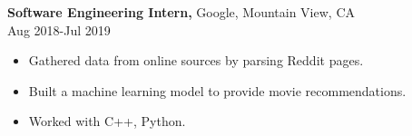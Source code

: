 \documentclass[margin]{res}
\begin{document}
\begin{resume}
{\bf Software Engineering Intern,} Google, Mountain View, CA \\ Aug 2018-Jul 2019
\begin{itemize} \itemsep -2pt %
\item Gathered data from online sources by parsing Reddit pages.
\item Built a machine learning model to provide movie recommendations.
\item Worked with C++, Python.
\end{itemize}

\end{resume} 
\end{document}
